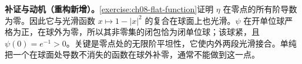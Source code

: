 \documentclass[../../main.tex]{subfiles}
\begin{document}
\begin{remark}
\textbf{补证与动机（重构新增）。}\cref{exercise:ch08-flat-function}证明 $\eta$ 在零点的所有阶导数为零。因此它与光滑函数 $x\mapsto1-|x|^2$ 的复合在球面上也光滑。$\psi$ 在开单位球严格为正，在球外为零，所以其非零集的闭包恰为闭单位球；该球紧，且 $\psi(0)=e^{-1}>0$。关键是零点处的无限阶平坦性，它使内外两段光滑接合。单纯把一个在球面处导数不消失的函数在球外补零，通常不能做到这一点。
\end{remark}

\end{document}
